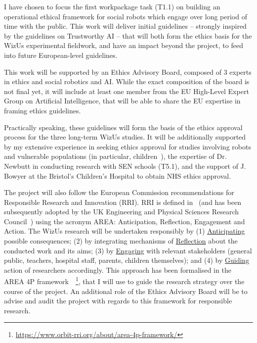 \documentclass[11pt,a4paper]{report}
\newcommand{\project}{WizUs\xspace}
\begin{document}
I have chosen to focus the first workpackage task (T1.1) on building an
operational ethical framework for social robots which engage over long period of
time with the public. This work will deliver initial guidelines -- strongly
inspired by the guidelines on Trustworthy AI -- that will both form the ethics
basis for the \project experimental fieldwork, and have an impact beyond the
project, to feed into future European-level guidelines.

This work will be supported by an Ethics Advisory Board, composed of 3 experts
in ethics and social robotics and AI. While the exact composition of the board
is not final yet, it will include at least one member from the EU High-Level
Expert Group on Artificial Intelligence, that will be able to share the EU
expertise in framing ethics guidelines.

Practically speaking, these guidelines will form the basis of the ethics
approval process for the three long-term \project studies. It will be
additionally supported by my extensive experience in seeking ethics approval for
studies involving robots and vulnerable populations (in particular,
children~\cite{lemaignan2016learning,lemaignan2018pinsoro,senft2019teaching}),
the expertise of Dr. Newbutt in conducting research with SEN schools (T5.1), and
the support of J. Bowyer at the Bristol's Children's Hospital to obtain NHS ethics
approval.


The project will also follow the European Commission recommendations for
Responsible Research and Innovation (RRI). RRI is defined
in~\cite{stilgoe2013developing} (and has been subsequently adopted by the UK Engineering
and Physical Sciences Research Council~\cite{owen2014uk}) using the acronym
AREA: Anticipation, Reflection, Engagement and Action. The \project research
will be undertaken responsibly by (1) \ul{Anticipating} possible consequences;
(2) by integrating mechanisms of \ul{Reflection} about the conducted work and its
aims; (3) by \ul{Engaging} with relevant stakeholders (general public, teachers,
hospital staff, parents, children themselves); and (4) by \ul{Guiding} action of
researchers accordingly. This approach has been formalised in the AREA 4P
framework~\cite{stahl2018implementing}~\footnote{\url{https://www.orbit-rri.org/about/area-4p-framework/}},
that I will use to guide the research strategy over the course of the project.
An additional role of the Ethics Advisory Board will be to advise and audit the
project with regards to this framework for responsible research.
\end{document}
